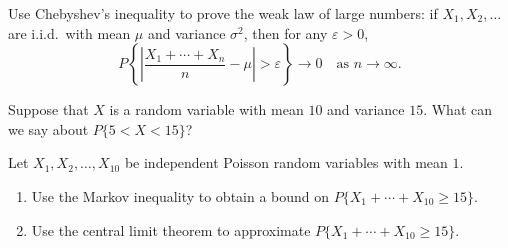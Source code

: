 
\begin{exercise}
\label{ex:random-variables-66}
Use Chebyshev's inequality to prove the weak law of large numbers: if $X_1, X_2, \ldots$ are i.i.d.\ with mean $\mu$ and variance $\sigma^2$, then for any $\varepsilon > 0$,
\[
P\!\left\{\left|\frac{X_1+\cdots+X_n}{n}-\mu\right| > \varepsilon\right\} \to 0 \quad \text{as } n \to \infty.
\]
\end{exercise}


\begin{exercise}
\label{ex:random-variables-67}
Suppose that $X$ is a random variable with mean $10$ and variance $15$. What can we say about $P\{5 < X < 15\}$?
\end{exercise}


\begin{exercise}
\label{ex:random-variables-68}
Let $X_1, X_2, \ldots, X_{10}$ be independent Poisson random variables with mean $1$.
\begin{enumerate}
    \item[(a)] Use the Markov inequality to obtain a bound on $P\{X_1+\cdots+X_{10} \geq 15\}$.
    \item[(b)] Use the central limit theorem to approximate $P\{X_1+\cdots+X_{10} \geq 15\}$.
\end{enumerate}
\end{exercise}

